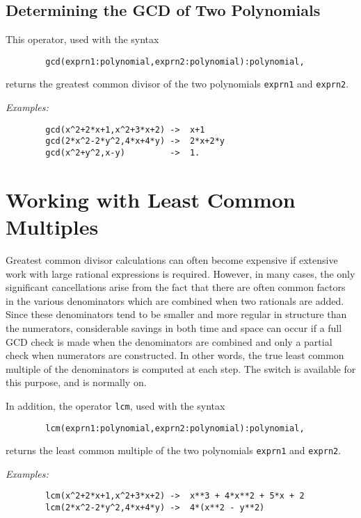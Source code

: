\subsection{Determining the GCD of Two Polynomials}
\hypertarget{operator:GCD}{}
This operator, used with the syntax
\begin{verbatim}
        gcd(exprn1:polynomial,exprn2:polynomial):polynomial,
\end{verbatim}
returns the greatest common divisor of the two polynomials \texttt{exprn1} and
\texttt{exprn2}.

\textit{Examples:}
\begin{verbatim}
        gcd(x^2+2*x+1,x^2+3*x+2) ->  x+1
        gcd(2*x^2-2*y^2,4*x+4*y) ->  2*x+2*y
        gcd(x^2+y^2,x-y)         ->  1.
\end{verbatim}

\section{Working with Least Common Multiples}
\hypertarget{switch:LCM}{}

Greatest common divisor calculations can often become expensive if
extensive work with large rational expressions is required. However, in
many cases, the only significant cancellations arise from the fact that
there are often common factors in the various denominators which are
combined when two rationals are added. Since these denominators tend to be
smaller and more regular in structure than the numerators, considerable
savings in both time and space can occur if a full GCD check is made when
the denominators are combined and only a partial check when numerators are
constructed. In other words, the true least common multiple of the
denominators is computed at each step. The switch 
is available for this purpose, and is normally on.

\hypertarget{operator:LCM}{}
In addition, the operator \texttt{lcm}, used with the syntax
\begin{verbatim}
        lcm(exprn1:polynomial,exprn2:polynomial):polynomial,
\end{verbatim}
returns the least common multiple of the two polynomials \texttt{exprn1} and
\texttt{exprn2}.

\textit{Examples:}
\begin{verbatim}
        lcm(x^2+2*x+1,x^2+3*x+2) ->  x**3 + 4*x**2 + 5*x + 2
        lcm(2*x^2-2*y^2,4*x+4*y) ->  4*(x**2 - y**2)
\end{verbatim}

